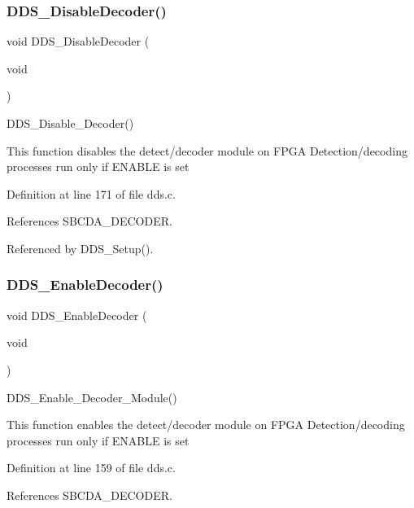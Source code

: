 \subsubsection{\texorpdfstring{D\+D\+S\+\_\+\+Disable\+Decoder()}{DDS\_DisableDecoder()}}
{\footnotesize\ttfamily void D\+D\+S\+\_\+\+Disable\+Decoder (\begin{DoxyParamCaption}\item[{void}]{ }\end{DoxyParamCaption})}

D\+D\+S\+\_\+\+Disable\+\_\+\+Decoder()

This function disables the detect/decoder module on F\+P\+GA Detection/decoding processes run only if E\+N\+A\+B\+LE is set 

Definition at line 171 of file dds.\+c.



References S\+B\+C\+D\+A\+\_\+\+D\+E\+C\+O\+D\+ER.



Referenced by D\+D\+S\+\_\+\+Setup().

\mbox{\label{group___d_d_s___a_p_i_gacd945ae15e0559f2d8dce2860354ed57}} 
\subsubsection{\texorpdfstring{D\+D\+S\+\_\+\+Enable\+Decoder()}{DDS\_EnableDecoder()}}
{\footnotesize\ttfamily void D\+D\+S\+\_\+\+Enable\+Decoder (\begin{DoxyParamCaption}\item[{void}]{ }\end{DoxyParamCaption})}

D\+D\+S\+\_\+\+Enable\+\_\+\+Decoder\+\_\+\+Module()

This function enables the detect/decoder module on F\+P\+GA Detection/decoding processes run only if E\+N\+A\+B\+LE is set 

Definition at line 159 of file dds.\+c.



References S\+B\+C\+D\+A\+\_\+\+D\+E\+C\+O\+D\+ER.

\mbox{\label{group___d_d_s___a_p_i_ga03744649eaa04f0f029df082e6ca9575}} 
